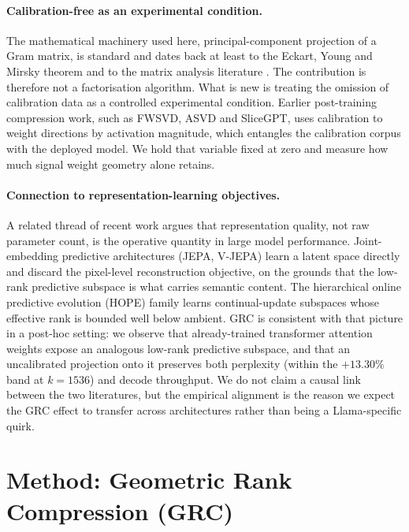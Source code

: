 \documentclass[11pt]{article}
\begin{document}
\paragraph{Calibration-free as an experimental condition.}
The mathematical machinery used here, principal-component projection of a
Gram matrix, is standard and dates back at least to the
Eckart, Young and Mirsky theorem \cite{eckart1936} and to the matrix
analysis literature \cite{trefethen1997nla,golub2013matrix}. The
contribution is therefore not a factorisation algorithm. What is new is
treating the omission of calibration data as a controlled experimental
condition. Earlier post-training compression work, such as FWSVD, ASVD and
SliceGPT, uses calibration to weight directions by activation magnitude,
which entangles the calibration corpus with the deployed model. We hold
that variable fixed at zero and measure how much signal weight geometry
alone retains.

\paragraph{Connection to representation-learning objectives.}
A related thread of recent work argues that representation quality, not
raw parameter count, is the operative quantity in large model performance.
Joint-embedding predictive architectures (JEPA, V-JEPA)
\cite{assran2023ijepa,bardes2024vjepa} learn a latent space directly and
discard the pixel-level reconstruction objective, on the grounds that the
low-rank predictive subspace is what carries semantic content. The
hierarchical online predictive evolution (HOPE) family
\cite{behrouz2025hope} learns continual-update subspaces whose effective
rank is bounded well below ambient. GRC is consistent with that picture in
a post-hoc setting: we observe that already-trained transformer attention
weights expose an analogous low-rank predictive subspace, and that an
uncalibrated projection onto it preserves both perplexity (within the
$+13.30\%$ band at $k{=}1536$) and decode throughput. We do not claim a
causal link between the two literatures, but the empirical alignment is the
reason we expect the GRC effect to transfer across architectures rather
than being a Llama-specific quirk.

\section{Method: Geometric Rank Compression (GRC)}
\label{sec:method}
\end{document}
